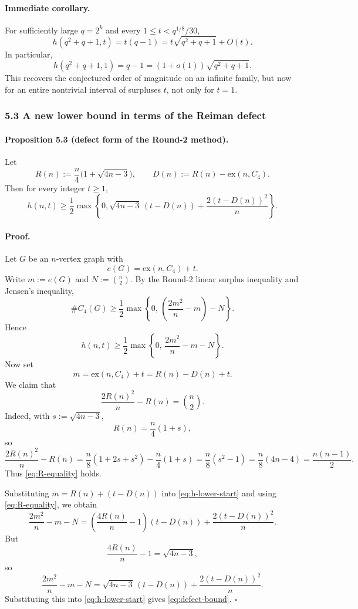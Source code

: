 \paragraph{Immediate corollary.}
For sufficiently large $q=2^k$ and every $1\le t<q^{1/8}/30$,
\[
h(q^2+q+1,t)=t(q-1)=t\sqrt{q^2+q+1}+O(t).
\]
In particular,
\[
h(q^2+q+1,1)=q-1=(1+o(1))\sqrt{q^2+q+1}.
\]
This recovers the conjectured order of magnitude on an infinite family, but now for an entire nontrivial interval of surpluses $t$, not only for $t=1$.

\subsubsection*{5.3 A new lower bound in terms of the Reiman defect}

\paragraph{Proposition 5.3 (defect form of the Round-2 method).}
Let
\[
R(n):=\frac n4\bigl(1+\sqrt{4n-3}\bigr),
\qquad
D(n):=R(n)-\mathrm{ex}(n,C_4).
\]
Then for every integer $t\ge 1$,
\begin{equation}
\label{eq:defect-bound}
 h(n,t)\ge \frac12\max\left\{0,\sqrt{4n-3}\,(t-D(n))+\frac{2(t-D(n))^2}{n}\right\}.
\end{equation}

\paragraph{Proof.}
Let $G$ be an $n$-vertex graph with
\[
e(G)=\mathrm{ex}(n,C_4)+t.
\]
Write $m:=e(G)$ and $N:=\binom n2$. By the Round-2 linear surplus inequality and Jensen's inequality,
\[
\#C_4(G)\ge \frac12\max\left\{0,\,\left(\frac{2m^2}{n}-m\right)-N\right\}.
\]
Hence
\begin{equation}
\label{eq:h-lower-start}
 h(n,t)\ge \frac12\max\left\{0,\,\frac{2m^2}{n}-m-N\right\}.
\end{equation}
Now set
\[
m=\mathrm{ex}(n,C_4)+t=R(n)-D(n)+t.
\]
We claim that
\begin{equation}
\label{eq:R-equality}
\frac{2R(n)^2}{n}-R(n)=\binom n2.
\end{equation}
Indeed, with $s:=\sqrt{4n-3}$,
\[
R(n)=\frac n4(1+s),
\]
so
\[
\frac{2R(n)^2}{n}-R(n)
=\frac{n}{8}(1+2s+s^2)-\frac n4(1+s)
=\frac{n}{8}(s^2-1)
=\frac{n}{8}(4n-4)
=\frac{n(n-1)}2.
\]
Thus \eqref{eq:R-equality} holds.

Substituting $m=R(n)+(t-D(n))$ into \eqref{eq:h-lower-start} and using \eqref{eq:R-equality}, we obtain
\[
\frac{2m^2}{n}-m-N
=\left(\frac{4R(n)}{n}-1\right)(t-D(n)) + \frac{2(t-D(n))^2}{n}.
\]
But
\[
\frac{4R(n)}{n}-1=\sqrt{4n-3},
\]
so
\[
\frac{2m^2}{n}-m-N
=\sqrt{4n-3}\,(t-D(n))+\frac{2(t-D(n))^2}{n}.
\]
Substituting this into \eqref{eq:h-lower-start} gives \eqref{eq:defect-bound}. \hfill$\square$

